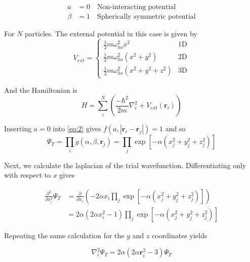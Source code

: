\documentclass[
    a4paper, aps, twocolumn, floatfix, superscriptaddress,
    nofootinbib]{revtex4-1}
\begin{document}
\begin{appendices}
\begin{align*}
    a&=0 \quad \text{Non-interacting potential} \\
    \beta& = 1 \quad \text{Spherically symmetric potential}
\end{align*}

For $N$ particles. The external potential in this case is given by 
\begin{equation}
    V_{ext} =
    \begin{cases}
      \frac{1}{2}m \omega_{ho}^2 x^2 &  1\text{D}\\
     \frac{1}{2}m \omega_{ho}^2\left( x^2 +  y^2 \right) & 2\text{D}\\
     \frac{1}{2}m \omega_{ho}^2\left(x^2 +  y^2 +z^2 \right) & 3\text{D}
    \end{cases} 
\end{equation}

And the Hamiltonian is 
\begin{equation}
    H = \sum_i^N \left(\frac{-\hbar^2}{2m} \nabla_i^2 + V_{ext}(\boldsymbol{r}_i)\right)
\end{equation}



Inserting $a=0$ into \eqref{eq:2} gives $f(a,|\boldsymbol{r}_i - \boldsymbol{r}_j|) =1$ and so
\begin{equation}
    \Psi_T = \prod_i g(\alpha,\beta,\boldsymbol{r}_j) = \prod_j \exp\left[ -\alpha \left(x_j^2 + y_j^2 + z_j^2\right)\right]
\end{equation}

Next, we calculate the laplacian of the trial wavefunction. Differentiating only with respect to $x$ gives

\begin{align*}
    \frac{\partial^2}{\partial x_i^2} \Psi_T &= \frac{\partial}{\partial x_i} \left(-2\alpha x_i \prod_j \exp\left[ -\alpha \left(x_j^2 + y_j^2 + z_j^2\right)\right] \right)\\
    &= 2\alpha \left(2\alpha x_i^2 -1\right) \prod_j \exp\left[ -\alpha \left(x_j^2 + y_j^2 + z_j^2\right)\right]
\end{align*}

Repeating the same calculation for the $y$ and $z$ coordinates yields



\begin{equation}
\nabla_i^2 \Psi_T = 2\alpha \left(2\alpha \boldsymbol{r}_i^2 -3\right) \Psi_T
\end{equation}


\end{appendices}
\end{document}
